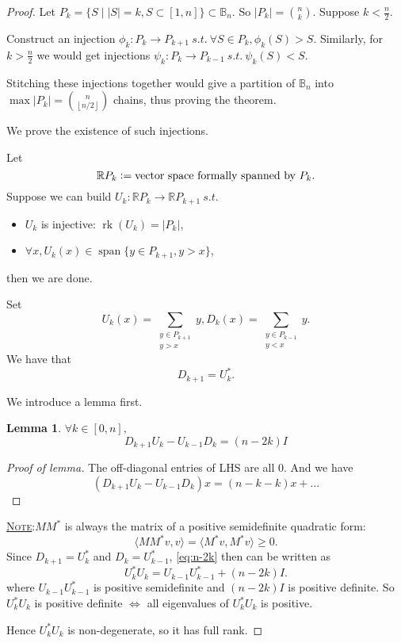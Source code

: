 \documentclass{report}
\newcommand{\R}{\mathbb{R}}
\newcommand{\st}{\ s.t.\ }
\def \rk {\operatorname{rk}}
\def \sp {\operatorname{span}}
\newcommand{\defeq}{\vcentcolon=}
\newcommand{\fancyem}[1]{\underline{\textsc{#1}}}
\newtheorem{lemma}{Lemma}[section]
\theoremstyle{definition}
\theoremstyle{remark}
\numberwithin{equation}{section}
\begin{document}
\begin{proof}
    Let $P_k = \{S \mid |S| = k, S \subset [1, n]\} \subset \mathbb{B}_n$. So $|P_k| = \binom{n}{k}$. Suppose $k < \frac{n}{2}$.
    
    Construct an injection $\phi_k: P_k \to P_{k+1} \st \forall S \in P_k, \phi_k(S) > S$. Similarly, for $k > \frac{n}{2}$ we would get injections $\psi_k: P_k \to P_{k-1} \st \psi_k(S) < S$.

    Stitching these injections together would give a partition of $\mathbb{B}_n$ into $\max|P_k| = \binom{n}{\left\lfloor n/2 \right\rfloor}$ chains, thus proving the theorem.

    We prove the existence of such injections.

    Let \[\R P_k \defeq \text{vector space formally spanned by $P_k$}.\]
    Suppose we can build $U_k: \R P_k \to \R P_{k+1} \st$ \begin{itemize}
        \item $U_k$ is injective: $\rk(U_k) = |P_k|$,
        \item $\forall x, U_k(x) \in \sp \{y \in P_{k+1}, y > x\}$,
    \end{itemize}
    then we are done.

    Set \[U_k(x) = \sum_{\substack{y \in P_{k+1} \\ y > x}} y, D_k(x) = \sum_{\substack{y \in P_{k-1}\\ y < x}}y.\]
    We have that \[D_{k+1} = U^*_k.\]

    We introduce a lemma first.
    \begin{lemma}
        $\forall k \in [0, n],$ \begin{equation}\label{eq:n-2k}
            D_{k+1}U_k - U_{k-1}D_k = (n - 2k)I
        \end{equation}
    \end{lemma}
    \begin{proof}[Proof of lemma]\let\qed\relax
       The off-diagonal entries of LHS are all $0$. And we have 
       \[(D_{k+1}U_k - U_{k-1}D_k)x = (n - k - k)x + \ldots\]
    \end{proof}

    \fancyem{Note}:$MM^*$ is always the matrix of a positive semidefinite quadratic form: \[
        \langle MM^*v, v\rangle = \langle M^*v, M^*v\rangle \geq 0.   
    \]
    Since $D_{k+1} = U_k^*$ and $D_{k} = U_{k-1}^*$, \eqref{eq:n-2k} then can be written as \[
        U_k^*U_k = U_{k-1}U_{k-1}^* + (n - 2k)I.
    \] where $U_{k-1}U_{k-1}^*$ is positive semidefinite and $(n - 2k)I$ is positive definite.
    So $U_k^*U_k$ is positive definite $\iff$ all eigenvalues of $U_k^*U_k$ is positive.

    Hence $U_k^*U_k$ is non-degenerate, so it has full rank.
\end{proof}
\end{document}
